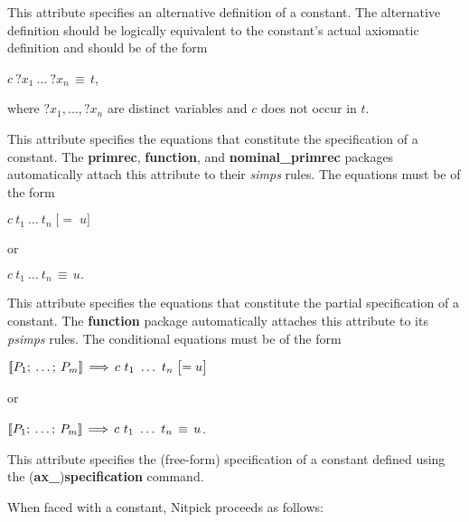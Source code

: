 \documentclass[a4paper,12pt]{article}
\begin{document}
\begin{enum}

\nopagebreak
This attribute specifies an alternative definition of a constant. The
alternative definition should be logically equivalent to the constant's actual
axiomatic definition and should be of the form

\qquad $c~{?}x_1~\ldots~{?}x_n \,\equiv\, t$,

where ${?}x_1, \ldots, {?}x_n$ are distinct variables and $c$ does not occur in
$t$.


\nopagebreak
This attribute specifies the equations that constitute the specification of a
constant. The \textbf{primrec}, \textbf{function}, and
\textbf{nominal\_\allowbreak primrec} packages automatically attach this
attribute to their \textit{simps} rules. The equations must be of the form

\qquad $c~t_1~\ldots\ t_n \;\bigl[{=}\; u\bigr]$

or

\qquad $c~t_1~\ldots\ t_n \,\equiv\, u.$


\nopagebreak
This attribute specifies the equations that constitute the partial specification
of a constant. The \textbf{function} package automatically attaches this
attribute to its \textit{psimps} rules. The conditional equations must be of the
form

\qquad $\mathopen{[\![} P_1;\> \ldots;\> P_m\mathclose{]\!]} \,\Longrightarrow\, c\ t_1\ \ldots\ t_n \;\bigl[{=}\; u\bigr]$

or

\qquad $\mathopen{[\![} P_1;\> \ldots;\> P_m\mathclose{]\!]} \,\Longrightarrow\, c\ t_1\ \ldots\ t_n \,\equiv\, u$.


\nopagebreak
This attribute specifies the (free-form) specification of a constant defined
using the \hbox{(\textbf{ax\_})}\allowbreak\textbf{specification} command.
\end{enum}

When faced with a constant, Nitpick proceeds as follows:
\end{document}

